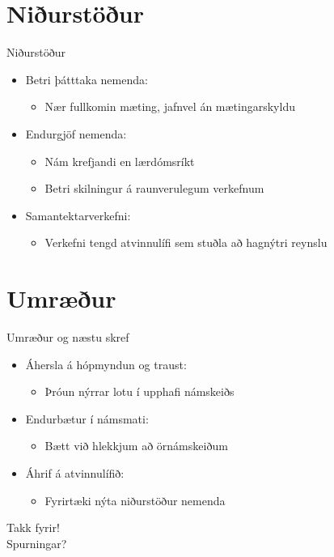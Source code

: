 \documentclass[
    NAME={Dr. Helga Ingimundardóttir},
    EMAIL={helgaingim@hi.is},
    FACULTY={Iðnaðarverkfræði},
    TITLE={Endurskoðun á námskeiði í Viðskiptagreind: },
    SUBTITLE={Hagnýt hæfni í brennidepli},
    SEMINAR={Ráðstefna kennsluakademíunnar},
    DATE={22 nóvember, 2024},
    WIDE={true},
    ICELANDIC={true}
]{HI-LaTeX/hi-beamer}
\begin{document}
\section{Niðurstöður}
\begin{frame}{Niðurstöður}
    \begin{itemize}
        \item Betri þátttaka nemenda:
        \begin{itemize}
            \item Nær fullkomin mæting, jafnvel án mætingarskyldu
        \end{itemize}
        \item Endurgjöf nemenda:
        \begin{itemize}
            \item Nám krefjandi en lærdómsríkt
            \item Betri skilningur á raunverulegum verkefnum
        \end{itemize}
        \item Samantektarverkefni:
        \begin{itemize}
            \item Verkefni tengd atvinnulífi sem stuðla að hagnýtri reynslu
        \end{itemize}
    \end{itemize}
\end{frame}

\section{Umræður}
\begin{frame}{Umræður og næstu skref}
    \begin{itemize}
        \item Áhersla á hópmyndun og traust:
        \begin{itemize}
            \item Þróun nýrrar lotu í upphafi námskeiðs
        \end{itemize}
        \item Endurbætur í námsmati:
        \begin{itemize}
            \item Bætt við hlekkjum að örnámskeiðum
        \end{itemize}
        \item Áhrif á atvinnulífið:
        \begin{itemize}
            \item Fyrirtæki nýta niðurstöður nemenda
        \end{itemize}
    \end{itemize}
\end{frame}

\begin{frame}
    \centering
    \Huge Takk fyrir! \\
    \normalsize Spurningar?
\end{frame}
\end{document}
